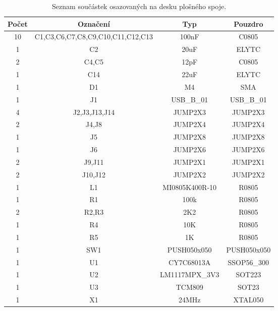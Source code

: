 \documentclass[12pt,a4paper,oneside]{article}
\begin{document}
\begin{savenotes}
\begin{table}[h!]
\begin{center}
\begin{tabular}{ |c|c|c|c| }
\hline 
Počet & Označení & Typ  & Pouzdro  \\ 
\hline 
10	&	C1,C3,C6,C7,C8,C9,C10,C11,C12,C13	&	100nF	&	C0805	\\
1	&	C2	&	20uF	&	ELYTC	\\
2	&	C4,C5	&	12pF	&	C0805	\\
1	&	C14	&	22uF	&	ELYTC	\\
1	&	D1	&	M4	&	SMA	\\
1	&	J1	&	USB\_B\_01	&	USB\_B\_01	\\
4	&	J2,J3,J13,J14	&	JUMP2X3	&	JUMP2X3	\\
2	&	J4,J8	&	JUMP2X4	&	JUMP2X4	\\
1	&	J5	&	JUMP2X8	&	JUMP2X8	\\
1	&	J6	&	JUMP2X6	&	JUMP2X6	\\
2	&	J9,J11	&	JUMP2X1	&	JUMP2X1	\\
2	&	J10,J12	&	JUMP2X2	&	JUMP2X2	\\
1	&	L1	&	MI0805K400R-10	&	R0805	\\
1	&	R1	&	100k	&	R0805	\\
2	&	R2,R3	&	2K2	&	R0805	\\
1	&	R4	&	10K	&	R0805	\\
1	&	R5	&	1K	&	R0805	\\
1	&	SW1	&	PUSH050x050	&	PUSH050x050	\\
1	&	U1	&	CY7C68013A	&	SSOP56\_300	\\
1	&	U2	&	LM1117MPX\_3V3	&	SOT223	\\
1	&	U3	&	TCM809	&	SOT23	\\
1	&	X1	&	24MHz	&	XTAL050	\\
\hline 
\end{tabular}
\end{center}
\caption{Seznam součástek osazovaných na desku plošného spoje.}
\label{seznam_soucastek_galvanic_isolation}
\end{table}
\end{savenotes}

\begin{thebibliography}{99}

\end{thebibliography}
\end{document}
